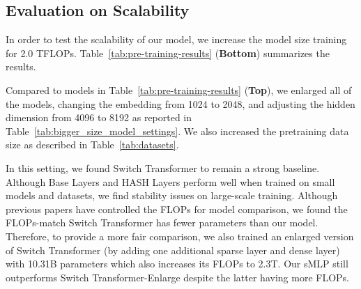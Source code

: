 \documentclass{article}
\begin{document}
\subsection{Evaluation on Scalability}
\label{sec:large_scale}






In order to test the scalability of our model, we increase the model size training for 2.0 TFLOPs. Table~\ref{tab:pre-training-results} (\textbf{Bottom}) summarizes the results. 


Compared to models in Table~\ref{tab:pre-training-results} (\textbf{Top}), we enlarged all of the models, changing the embedding from 1024 to 2048, and adjusting the hidden dimension from 4096 to 8192 as reported in Table~\ref{tab:bigger_size_model_settings}. We also increased the pretraining data size as described in Table~\ref{tab:datasets}.


In this setting, we found Switch Transformer to remain a strong baseline. Although Base Layers and HASH Layers perform well when trained on small models and datasets, we find stability issues on large-scale training. Although previous papers \citep{switch,gshard} have controlled the FLOPs for model comparison, we found the FLOPs-match Switch Transformer has fewer parameters than our model. Therefore, to provide a more fair comparison, we also trained an enlarged version of Switch Transformer (by adding one additional sparse layer and dense layer) with 10.31B parameters which also increases its FLOPs to 2.3T. Our sMLP still outperforms Switch Transformer-Enlarge despite the latter having more FLOPs. 
\end{document}
